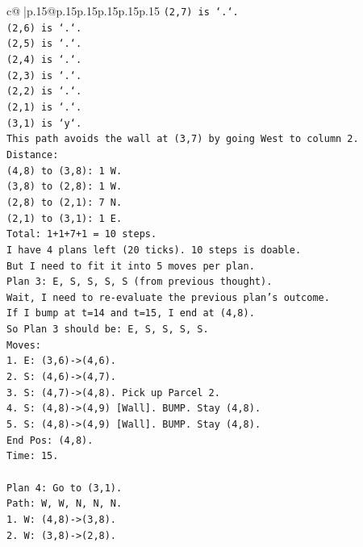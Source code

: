 \documentclass{article}
\begin{document}
{\begin{supertabular}{c@{$\;$}|p{.15\linewidth}@{}p{.15\linewidth}p{.15\linewidth}p{.15\linewidth}p{.15\linewidth}p{.15\linewidth}}
{{{\texttt{(2,7) is `.`.} \\
\texttt{(2,6) is `.`.} \\
\texttt{(2,5) is `.`.} \\
\texttt{(2,4) is `.`.} \\
\texttt{(2,3) is `.`.} \\
\texttt{(2,2) is `.`.} \\
\texttt{(2,1) is `.`.} \\
\texttt{(3,1) is `y`.} \\
\texttt{This path avoids the wall at (3,7) by going West to column 2.} \\
\texttt{Distance:} \\
\texttt{(4,8) to (3,8): 1 W.} \\
\texttt{(3,8) to (2,8): 1 W.} \\
\texttt{(2,8) to (2,1): 7 N.} \\
\texttt{(2,1) to (3,1): 1 E.} \\
\texttt{Total: 1+1+7+1 = 10 steps.} \\
\texttt{I have 4 plans left (20 ticks). 10 steps is doable.} \\
\texttt{But I need to fit it into 5 moves per plan.} \\
\texttt{Plan 3: E, S, S, S, S (from previous thought).} \\
\texttt{Wait, I need to re{-}evaluate the previous plan's outcome.} \\
\texttt{If I bump at t=14 and t=15, I end at (4,8).} \\
\texttt{So Plan 3 should be: E, S, S, S, S.} \\
\texttt{Moves:} \\
\texttt{1. E: (3,6){-}>(4,6).} \\
\texttt{2. S: (4,6){-}>(4,7).} \\
\texttt{3. S: (4,7){-}>(4,8). Pick up Parcel 2.} \\
\texttt{4. S: (4,8){-}>(4,9) {[}Wall{]}. BUMP. Stay (4,8).} \\
\texttt{5. S: (4,8){-}>(4,9) {[}Wall{]}. BUMP. Stay (4,8).} \\
\texttt{End Pos: (4,8).} \\
\texttt{Time: 15.} \\
\\ 
\texttt{Plan 4: Go to (3,1).} \\
\texttt{Path: W, W, N, N, N.} \\
\texttt{1. W: (4,8){-}>(3,8).} \\
\texttt{2. W: (3,8){-}>(2,8).} \\
}}}
\end{supertabular}}
\end{document}
